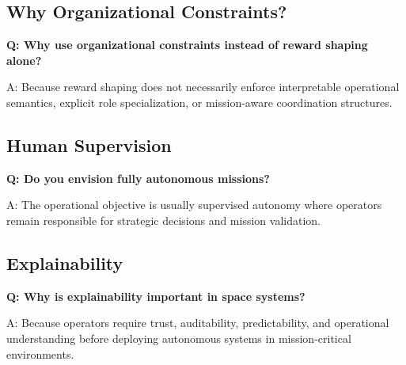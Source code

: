 \documentclass[10pt,a4paper,twocolumn]{article}
\begin{document}

\subsection{Why Organizational Constraints?}

\begin{questionbox}
    \textbf{Q: Why use organizational constraints instead of reward shaping alone?}

    A: Because reward shaping does not necessarily enforce interpretable operational semantics, explicit role specialization, or mission-aware coordination structures.
\end{questionbox}


\subsection{Human Supervision}

\begin{questionbox}
    \textbf{Q: Do you envision fully autonomous missions?}

    A: The operational objective is usually supervised autonomy where operators remain responsible for strategic decisions and mission validation.
\end{questionbox}


\subsection{Explainability}

\begin{questionbox}
    \textbf{Q: Why is explainability important in space systems?}

    A: Because operators require trust, auditability, predictability, and operational understanding before deploying autonomous systems in mission-critical environments.
\end{questionbox}

\end{document}
